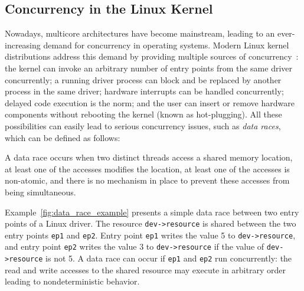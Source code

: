 \subsection{Concurrency in the Linux Kernel}
\label{bg:concurrency}


Nowadays, multicore architectures have become mainstream, leading to an ever-increasing demand for concurrency in operating systems. Modern Linux kernel distributions address this demand by providing multiple sources of concurrency~\cite{corbet2005linux}: the kernel can invoke an arbitrary number of entry points from the same driver concurrently; a running driver process can block and be replaced by another process in the same driver; hardware interrupts can be handled concurrently; delayed code execution is the norm; and the user can insert or remove hardware components without rebooting the kernel (known as hot-plugging). All these possibilities can easily lead to serious concurrency issues, such as \emph{data races}, which can be defined as follows:

\begin{definition}
\label{definition:datarace}
A data race occurs when two distinct threads access a shared memory location, at least one of the accesses modifies the location, at least one of the accesses is non-atomic, and there is no mechanism in place to prevent these accesses from being simultaneous.
\end{definition}


  Example~\ref{fig:data_race_example} presents a simple data race between two entry points of a Linux driver. The resource \texttt{dev->resource} is shared between the two entry points \texttt{ep1} and \texttt{ep2}. Entry point \texttt{ep1} writes the value 5 to \texttt{dev->resource}, and entry point \texttt{ep2} writes the value 3 to \texttt{dev->resource} if the value of \texttt{dev->resource} is not 5. A data race can occur if \texttt{ep1} and \texttt{ep2} run concurrently: the read and write accesses to the shared resource may execute in arbitrary order leading to nondeterministic behavior.  

